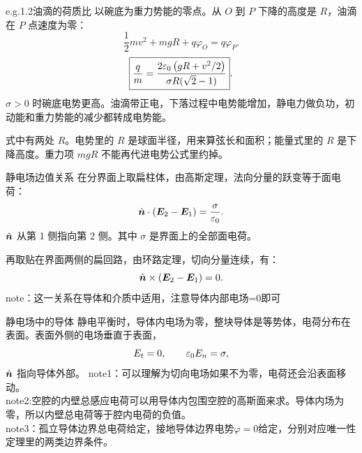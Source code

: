 \begin{frame}{e.g.1.2油滴的荷质比}
以碗底为重力势能的零点。从 $O$ 到 $P$ 下降的高度是 $R$，油滴在 $P$ 点速度为零：
\[
 \frac12 mv^2+mgR+q\varphi_O=q\varphi_P.
\]
\[
 \boxed{\frac qm
 =\frac{2\varepsilon_0\left(gR+v^2/2\right)}{\sigma R(\sqrt2-1)}}.
\]
$\sigma>0$ 时碗底电势更高。油滴带正电，下落过程中电势能增加，静电力做负功，初动能和重力势能的减少都转成电势能。

式中有两处 $R$。电势里的 $R$ 是球面半径，用来算弦长和面积；能量式里的 $R$ 是下降高度。重力项 $mgR$ 不能再代进电势公式里约掉。
\end{frame}

\begin{frame}{静电场边值关系}
在分界面上取扁柱体，由高斯定理，法向分量的跃变等于面电荷：
\[
 \hat{\bm{n}}\cdot(\bm{E}_2-\bm{E}_1)=\frac{\sigma}{\varepsilon_0}.
\]
$\hat{\bm{n}}$ 从第 1 侧指向第 2 侧。其中 $\sigma$ 是界面上的全部面电荷。

再取贴在界面两侧的扁回路，由环路定理，切向分量连续，有：
\[
 \hat{\bm{n}}\times(\bm{E}_2-\bm{E}_1)=0.
\]
note：这一关系在导体和介质中适用，注意导体内部电场=0即可
\end{frame}

\begin{frame}{静电场中的导体}
静电平衡时，导体内电场为零，整块导体是等势体，电荷分布在表面。表面外侧的电场垂直于表面，
\[
 E_t=0,\qquad \varepsilon_0 E_n=\sigma,
\]
$\hat{\bm{n}}$ 指向导体外部。
note1：可以理解为切向电场如果不为零，电荷还会沿表面移动。\\

note2:空腔的内壁总感应电荷可以用导体内包围空腔的高斯面来求。导体内场为零，所以内壁总电荷等于腔内电荷的负值。\\

note3：孤立导体边界总电荷给定，接地导体边界电势$\varphi=0$给定，分别对应唯一性定理里的两类边界条件。
\end{frame}

